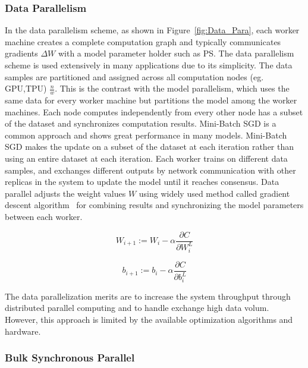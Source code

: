 \documentclass[conference]{IEEEtran}
\begin{document}
\subsubsection{Data Parallelism}
\label{sec:dp}

In the data parallelism scheme, as shown in Figure~\ref{fig:Data_Para}, each worker machine creates a complete computation graph and typically communicates gradients $\Delta W$ with a model parameter holder such as PS. The data parallelism scheme is used extensively in many applications due to its simplicity. The data samples are partitioned and assigned across all computation nodes (eg. GPU,TPU) $\frac{n}{w}$. This is the contrast with the model parallelism, which uses the same data for every worker machine but partitions the model among the worker machines. Each node computes independently from every other node has a subset of the dataset and synchronizes computation results. Mini-Batch SGD is a common approach and shows great performance in many models. Mini-Batch SGD makes the update on a subset of the dataset at each iteration rather than using an entire dataset at each iteration. Each worker trains on different data samples, and exchanges different outputs by network communication with other replicas in the system to update the model until it reaches consensus. Data parallel adjusts the weight values $W$ using widely used method called gradient descent algorithm~\cite{SGD} for combining results and synchronizing the model parameters between each worker.

\begin{equation}
W_{i+1} := W_{i} - \alpha\frac{\partial{C}}{\partial{W_{i}^{L}}}
\end{equation}

\begin{equation}
b_{i+1} := b_{i} - \alpha\frac{\partial{C}}{\partial{b_{i}^{L}}}
\end{equation}

The data parallelization merits are to increase the system throughput through distributed parallel computing and to handle  exchange high data volum. However, this approach is limited by the available optimization algorithms and hardware.

\subsubsection{Bulk Synchronous Parallel}
\label{sec:bsp}
\end{document}
